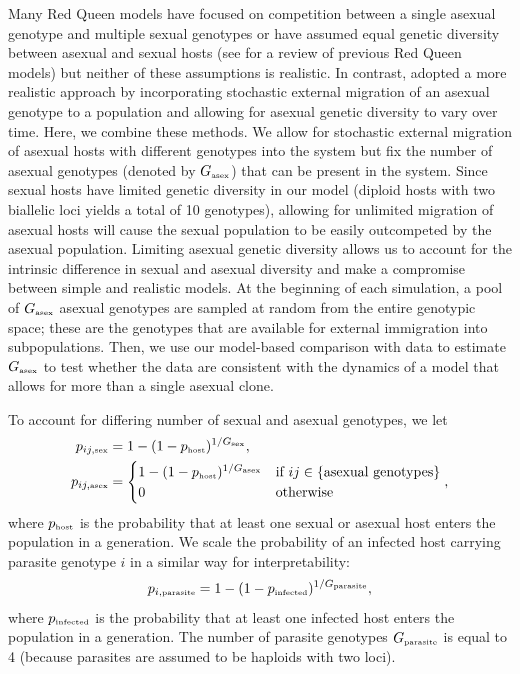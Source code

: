 \documentclass{article}\usepackage[]{graphicx}\usepackage[]{color}
\begin{document}
Many Red Queen models have focused on competition between a single asexual genotype and multiple sexual genotypes or have assumed equal genetic diversity between asexual and sexual hosts (see \cite{ashby2015diversity} for a review of previous Red Queen models) but neither of these assumptions is realistic.
In contrast, \cite{ashby2015diversity} adopted a more realistic approach by incorporating stochastic external migration of an asexual genotype to a population and allowing for asexual genetic diversity to vary over time.
Here, we combine these methods.
We allow for stochastic external migration of asexual hosts with different genotypes into the system but fix the number of asexual genotypes (denoted by $G_{\textrm{\tiny asex}}$) that can be present in the system. 
Since sexual hosts have limited genetic diversity in our model (diploid hosts with two biallelic loci yields a total of 10 genotypes), allowing for unlimited migration of asexual hosts will cause the sexual population to be easily outcompeted by the asexual population.
Limiting asexual genetic diversity allows us to account for the intrinsic difference in sexual and asexual diversity and make a compromise between simple and realistic models.
At the beginning of each simulation, a pool of $G_{\textrm{\tiny asex}}$ asexual genotypes are sampled at random from the entire genotypic space; these are the genotypes that are available for external immigration into subpopulations.
Then, we use our model-based comparison with data to estimate $G_{\textrm{\tiny asex}}$ to test whether the data are consistent with the dynamics of a model that allows for more than a single asexual clone.

To account for differing number of sexual and asexual genotypes, we let 
\begin{equation}
\begin{aligned}
p_{ij, \textrm{\tiny sex}} &= 1-(1-p_{\textrm{\tiny host}})^{1/G_\textrm{\tiny sex}},\\
p_{ij, \textrm{\tiny asex}} &=
\begin{cases}
1-(1-p_{\textrm{\tiny host}})^{1/G_\textrm{\tiny asex}} & \text{if } ij \in \{\text{asexual genotypes}\} \\
0 & \text{otherwise}
\end{cases},
\end{aligned}
\end{equation}
where $p_{\textrm{\tiny host}}$ is the probability that at least one sexual or asexual host enters the population in a generation. We scale the probability of an infected host carrying parasite genotype $i$ in a similar way for interpretability:
\begin{equation}
p_{i, \textrm{\tiny parasite}} = 1 - (1-p_{\textrm{\tiny infected}})^{1/G_\textrm{\tiny parasite}},
\end{equation}
where $p_{\textrm{\tiny infected}}$ is the probability that at least one infected host enters the population in a generation.
The number of parasite genotypes $G_\textrm{\tiny parasite}$ is equal to 4 (because parasites are assumed to be haploids with two loci).
\end{document}
